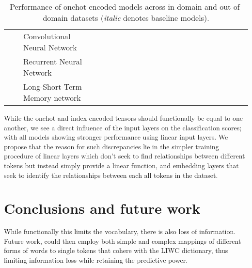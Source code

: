 \begin{landscape}
\begin{table}[]
{\begin{tabular}{ccl|llll|llll|llll|llll|llll}
                                     &                         & Convolutional Neural Network    &    &     &      &             &    &     &      &           &    &     &      &          &    &     &      &               &    &     &      &          \\
                                     &                         & Recurrent Neural Network        &    &     &      &             &    &     &      &           &    &     &      &          &    &     &      &               &    &     &      &          \\
                                     &                         & Long-Short Term Memory network  &    &     &      &             &    &     &      &           &    &     &      &          &    &     &      &               &    &     &      &          \\
\end{tabular}%
}
\caption{Performance of onehot-encoded models across in-domain and out-of-domain datasets (\textit{italic} denotes baseline models).}
\label{tab:redux_embedding_davidson}
\end{table}
\end{landscape}

While the onehot and index encoded tensors should functionally be equal to one another, we see a direct influence of the input layers on the classification scores; with all models showing stronger performance using linear input layers. We propose that the reason for such discrepancies lie in the simpler training procedure of linear layers which don't seek to find relationships between different tokens but instead simply provide a linear function, and embedding layers that seek to identify the relationships between each all tokens in the dataset.

\section{Conclusions and future work}

While functionally this limits the vocabulary, there is also loss of information. Future work, could then employ both simple and complex mappings of different forms of words to single tokens that cohere with the LIWC dictionary, thus limiting information loss while retaining the predictive power.

\zw{}
